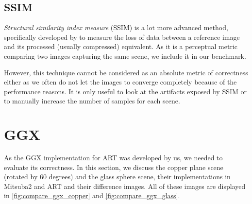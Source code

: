 \subsection{SSIM}
\emph{Structural similarity index measure} (SSIM) is a lot more advanced method, specifically developed by \citet{wang2004image} to measure the loss of data between a reference image and its processed (usually compressed) equivalent. As it is a perceptual metric comparing two images capturing the same scene, we include it in our benchmark.

However, this technique cannot be considered as an absolute metric of correctness either as we often do not let the images to converge completely because of the performance reasons. It is only useful to look at the artifacts exposed by SSIM or to manually increase the number of samples for each scene. 

\section{GGX}

As the GGX implementation for ART was developed by us, we needed to evaluate its correctness. In this section, we discuss the copper plane scene (rotated by 60 degrees) and the glass sphere scene, their implementations in Mitsuba2 and ART and their difference images. All of these images are displayed in \autoref{fig:compare_ggx_copper} and \autoref{fig:compare_ggx_glass}.


